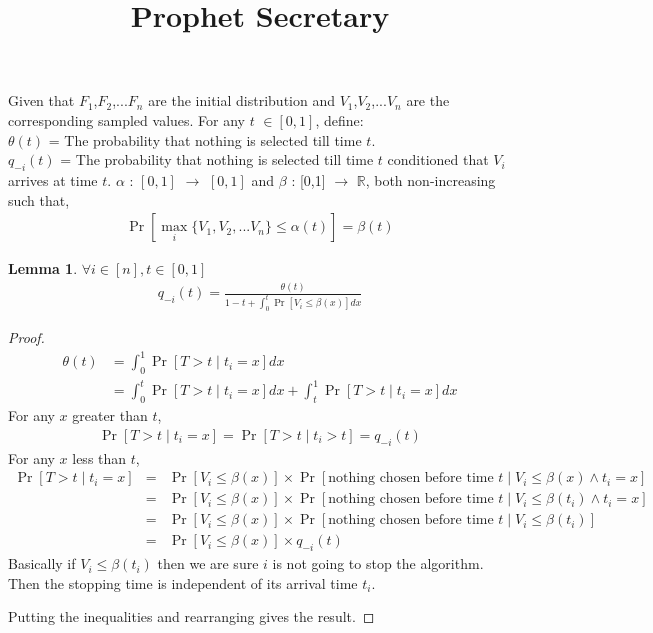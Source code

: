 \documentclass[10pt, letterpaper, twoside]{article}
\title{Prophet Secretary}
\newtheorem{lemma}[theorem]{Lemma}
\begin{document}
	
	\maketitle
	Given that $F_{1}$,$F_{2}$,...$F_{n}$ are the initial distribution and $V_{1}$,$V_{2}$,...$V_{n}$ are the corresponding sampled values. For any $t$ $\in [0,1] $, define:\\
	$\theta(t)$ = The probability that nothing is selected till time $t$.\\
	$q_{-i}(t)$ = The probability that nothing is selected till time $t$ conditioned that $V_{i}$ arrives at time $t$.
	$\alpha$ : $[0,1]$ $\rightarrow$ $[0,1]$ and $\beta$ : [0,1] $\rightarrow$ $\mathbb{R}$, both non-increasing such that,
	\begin{align*}
	\Pr[\max_{i} \{V_{1},V_{2},...V_{n}\} \leq \alpha(t)] = \beta(t)
	\end{align*}
	\begin{lemma} $\forall i \in [n], t \in [0,1]$
		\begin{align*}
		q_{-i}(t) = \frac{\theta(t)}{1-t+\int_{0}^{t} \Pr[V_{i} \leq \beta(x)]  dx}
		\end{align*}
	\end{lemma}
	\begin{proof}
		\begin{align*}
		\theta(t) &= \int_{0}^{1} \Pr[T > t \mid t_{i} = x] dx\\
		&= \int_{0}^{t} \Pr[T > t \mid t_{i} = x] dx + \int_{t}^{1} \Pr[T > t \mid t_{i} = x] dx
		\end{align*}
		For any $x$ greater than $t$,
		\begin{align*}
		\Pr[T > t \mid t_{i} = x] = \Pr[T > t \mid t_{i} > t] = q_{-i}(t)
		\end{align*}
		For any $x$ less than $t$,
		\begin{eqnarray*}
			\Pr[T > t \mid t_{i} = x] & = & \Pr[V_{i} \leq \beta(x)] \times \Pr[\text{nothing chosen before time }t \mid V_{i} \leq \beta(x) \wedge t_{i} = x]\\
			& = & \Pr[V_{i} \leq \beta(x)] \times \Pr[\text{nothing chosen before time }t \mid V_{i} \leq \beta(t_i) \wedge t_{i} = x]\\
			& = & \Pr[V_{i} \leq \beta(x)] \times \Pr[\text{nothing chosen before time }t \mid V_{i} \leq \beta(t_i)]\\
			& = & \Pr[V_{i} \leq \beta(x)] \times q_{-i}(t)
		\end{eqnarray*}
		Basically if $V_{i} \leq \beta(t_i)$ then we are sure $i$ is not going to stop the algorithm. Then the stopping time is independent of its arrival time $t_i$.
		
		Putting the inequalities and rearranging gives the result.
	\end{proof}
\end{document}
